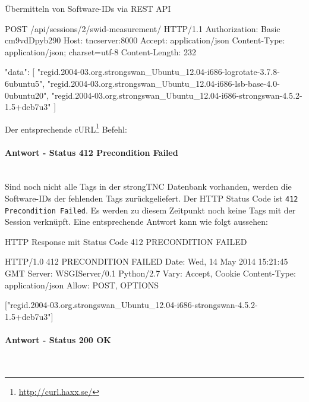 \begin{listing}
\caption{Übermitteln von Software-IDs via REST API}
\begin{httpcode}
POST /api/sessions/2/swid-measurement/ HTTP/1.1
Authorization: Basic cm9vdDpyb290
Host: tncserver:8000
Accept: application/json
Content-Type: application/json; charset=utf-8
Content-Length: 232

{
	"data":
	[
		"regid.2004-03.org.strongswan_Ubuntu_12.04-i686-logrotate-3.7.8-6ubuntu5",
		"regid.2004-03.org.strongswan_Ubuntu_12.04-i686-lsb-base-4.0-0ubuntu20",
		"regid.2004-03.org.strongswan_Ubuntu_12.04-i686-strongswan-4.5.2-1.5+deb7u3"
	]
}
\end{httpcode}
\end{listing}

Der entsprechende cURL\footnote{\url{http://curl.haxx.se/}} Befehl:



\paragraph{Antwort - Status 412 Precondition Failed} \hspace{0pt} \\
Sind noch nicht alle Tags in der strongTNC Datenbank vorhanden, werden die
Software-IDs der fehlenden Tags zurückgeliefert. Der HTTP Status Code ist
\texttt{412 Precondition Failed}. Es werden zu diesem Zeitpunkt noch keine Tags
mit der Session verknüpft. Eine entsprechende Antwort kann wie folgt aussehen:

\begin{listing}
\caption{HTTP Response mit Status Code 412 PRECONDITION FAILED}
\begin{httpcode}
HTTP/1.0 412 PRECONDITION FAILED
Date: Wed, 14 May 2014 15:21:45 GMT
Server: WSGIServer/0.1 Python/2.7
Vary: Accept, Cookie
Content-Type: application/json
Allow: POST, OPTIONS

["regid.2004-03.org.strongswan_Ubuntu_12.04-i686-strongswan-4.5.2-1.5+deb7u3"]
\end{httpcode}
\end{listing}

\paragraph{Antwort - Status 200 OK} \hspace{0pt} \\

